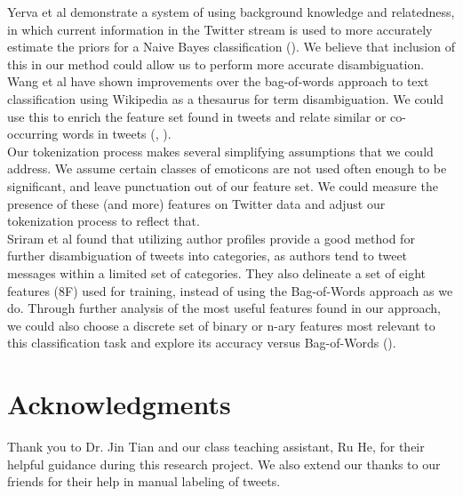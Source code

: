 \documentclass[letterpaper]{article}
\begin{document}
Yerva et al demonstrate a system of using background knowledge and relatedness, in which current information in the Twitter stream is used to more accurately estimate the priors for a Naive Bayes classification (\citeauthor{journals/ijcsa/YervaMA12}). We believe that inclusion of this in our method could allow us to perform more accurate disambiguation.\\

Wang et al have shown improvements over the bag-of-words approach to text classification using Wikipedia as a thesaurus for term disambiguation. We could use this to enrich the feature set found in tweets and relate similar or co-occurring words in tweets (\citeauthor{Wang:2008:UWC:1510528.1511383}, \citeauthor{Wang:2009:UWK:1554488.1554492}).\\

Our tokenization process makes several simplifying assumptions that we could address. We assume certain classes of emoticons are not used often enough to be significant, and leave punctuation out of our feature set. We could measure the presence of these (and more) features on Twitter data and adjust our tokenization process to reflect that.\\

Sriram et al found that utilizing author profiles provide a good method for further disambiguation of tweets into categories, as authors tend to tweet messages within a limited set of categories. They also delineate a set of eight features (8F) used for training, instead of using the Bag-of-Words approach as we do. Through further analysis of the most useful features found in our approach, we could also choose a discrete set of binary or n-ary features most relevant to this classification task and explore its accuracy versus Bag-of-Words (\citeauthor{Sriram:2010:STC:1835449.1835643}).

\section{ Acknowledgments}
Thank you to Dr. Jin Tian and our class teaching assistant, Ru He, for their helpful guidance during this research project. We also extend our thanks to our friends for their help in manual labeling of tweets.





\end{document}
